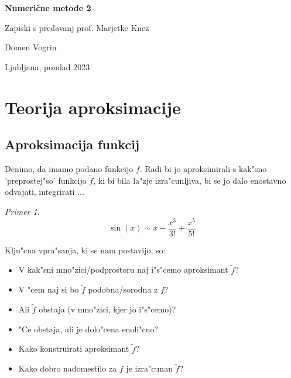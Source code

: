 \documentclass[a4paper,12pt]{article}
\theoremstyle{definition}
\theoremstyle{remark}
\newtheorem*{ex}{Primer}
\begin{document}

\begin{titlepage}
    \begin{center}
        
        \vspace*{3cm}
            
        \Huge
        \textbf{Numerične metode 2}

        \large
        Zapiski s predavanj prof. Marjetke Knez

        \vspace*{0.5cm}
        \LARGE
        Domen Vogrin

        \vfill
        \normalsize
        Ljubljana, pomlad 2023
    \end{center}

\end{titlepage}

\clearpage

\tableofcontents
\newpage
{}


\section{Teorija aproksimacije}

\subsection{Aproksimacija funkcij}
Denimo, da imamo podano funkcijo $f$. Radi bi jo aproksimirali s kak"sno 'preprostej"so' funkcijo $\tilde{f}$, ki bi bila la"zje izra"cunljiva, bi se jo dalo enostavno odvajati, integrirati ...

\begin{ex}
    \[\sin(x) \sim x - \frac{x^3}{3!} + \frac{x^5}{5!}\]
\end{ex}


Klju"cna vpra"sanja, ki se nam postavijo, so:
\begin{itemize}
    \item V kak"sni mno"zici/podprostoru naj i"s"cemo aproksimant $\tilde{f}$?
    \item V "cem naj si bo $\tilde{f}$ podobna/sorodna z $f$?
    \item Ali $\tilde{f}$ obstaja (v mno"zici, kjer jo i"s"cemo)?
    \item "Ce obstaja, ali je dolo"cena enoli"cno?
    \item Kako konstruirati aproksimant $\tilde{f}$?
    \item Kako dobro nadomestilo za $f$ je izra"cunan $\tilde{f}$?
\end{itemize}
\end{document}
